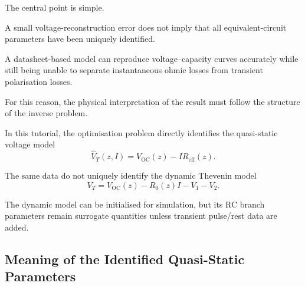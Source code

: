 \documentclass[a4paper,12pt]{article}
\begin{document}
The central point is simple.

A small voltage-reconstruction error does not imply that all equivalent-circuit parameters have been uniquely identified.

A datasheet-based model can reproduce voltage--capacity curves accurately while still being unable to separate instantaneous ohmic losses from transient polarisation losses.

For this reason, the physical interpretation of the result must follow the structure of the inverse problem.

\begin{center}
\end{center}

In this tutorial, the optimisation problem directly identifies the quasi-static voltage model
\begin{equation}
\hat{V}_T(z,I)
=
V_{\mathrm{OC}}(z)
-
IR_{\mathrm{eff}}(z).
\label{eq:interp_static_model}
\end{equation}

The same data do not uniquely identify the dynamic Thevenin model
\begin{equation}
V_T
=
V_{\mathrm{OC}}(z)
-
R_0(z)I
-
V_1
-
V_2.
\label{eq:interp_dynamic_model}
\end{equation}

The dynamic model can be initialised for simulation, but its RC branch parameters remain surrogate quantities unless transient pulse/rest data are added.

\subsection{Meaning of the Identified Quasi-Static Parameters}
\end{document}
